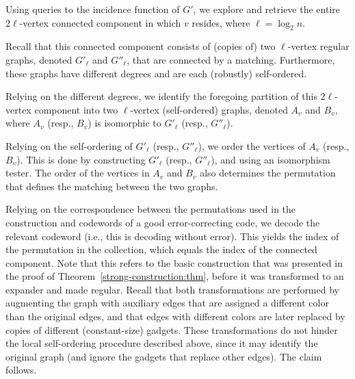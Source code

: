 \BE
\item
Using queries to the incidence function of $G'$,
we explore and retrieve the entire $2\ell$-vertex
connected component in which $v$ resides, where $\ell=\log_2n$.

Recall that this connected component consists of (copies of)
two $\ell$-vertex regular graphs, denoted $G'_\ell$ and $G''_\ell$,
that are connected by a matching.
Furthermore, these graphs have different degrees
and are each (robustly) self-ordered.
\item
Relying on the different degrees,
we identify the foregoing partition of this $2\ell$-vertex component
into two $\ell$-vertex (self-ordered) graphs,
denoted $A_v$ and $B_v$, where $A_v$ (resp., $B_v$)
is isomorphic to $G'_\ell$ (resp., $G''_\ell$).
\item
Relying on the self-ordering of $G'_\ell$ (resp., $G''_\ell$),
we order the vertices of $A_v$ (resp., $B_v$).
This is done by constructing $G'_\ell$ (resp., $G''_\ell$),
and using an isomorphism tester.
The order of the vertices in $A_v$ and $B_v$ also determines
the permutation that defines the matching between the two graphs.
\item
Relying on the correspondence between the permutations used
in the construction and codewords of a good error-correcting code,
we decode the relevant codeword (i.e., this is decoding without error).
This yields the index of the permutation in the collection,
which equals the index of the connected component.
\EE
Note that this refers to the basic construction that was presented
in the proof of Theorem~\ref{strong-construction:thm},
before it was transformed to an expander and made regular.
Recall that both transformations are performed by augmenting
the graph with auxiliary edges that are assigned a different color
than the original edges, and that edges with different colors
are later replaced by copies of different (constant-size) gadgets.
These transformations do not hinder the local self-ordering procedure
described above, since it may identify the original graph
(and ignore the gadgets that replace other edges).
The claim follows.
\EPF
%


